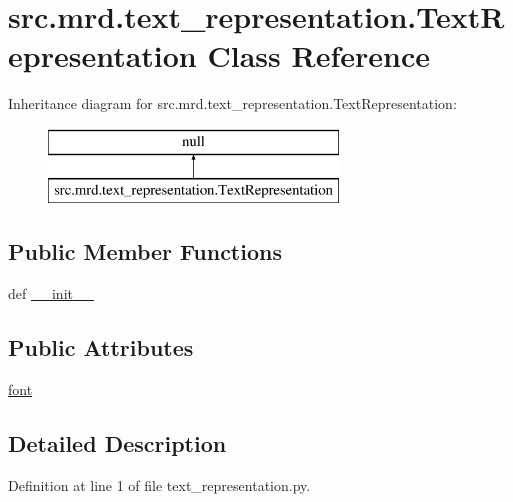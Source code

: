 \hypertarget{classsrc_1_1mrd_1_1text__representation_1_1_text_representation}{\section{src.\+mrd.\+text\+\_\+representation.\+Text\+Representation Class Reference}
\label{classsrc_1_1mrd_1_1text__representation_1_1_text_representation}
}
Inheritance diagram for src.\+mrd.\+text\+\_\+representation.\+Text\+Representation\+:\begin{figure}[H]
\begin{center}
\leavevmode
\includegraphics[height=2.000000cm]{classsrc_1_1mrd_1_1text__representation_1_1_text_representation}
\end{center}
\end{figure}
\subsection*{Public Member Functions}
\begin{DoxyCompactItemize}
\item 
def \hyperlink{classsrc_1_1mrd_1_1text__representation_1_1_text_representation_a98459b3b051d2c775b07afb717790a0e}{\+\_\+\+\_\+init\+\_\+\+\_\+}
\end{DoxyCompactItemize}
\subsection*{Public Attributes}
\begin{DoxyCompactItemize}
\item 
\hyperlink{classsrc_1_1mrd_1_1text__representation_1_1_text_representation_a2b2880efe2811abb1363e5a917c91f27}{font}
\end{DoxyCompactItemize}


\subsection{Detailed Description}


Definition at line 1 of file text\+\_\+representation.\+py.



